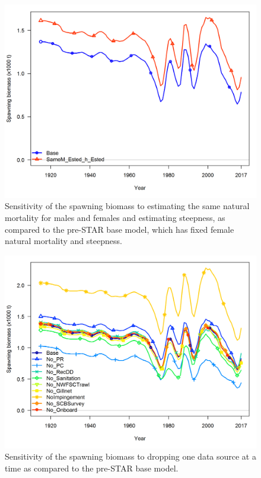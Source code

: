\documentclass[12pt,]{article}
\begin{document}
\FloatBarrier

\begin{figure}[htbp]
\centering
\includegraphics{Figures/sensitivity_spawnbio.png}
\caption{Sensitivity of the spawning biomass to estimating the same
natural mortality for males and females and estimating steepness, as
compared to the pre-STAR base model, which has fixed female natural
mortality and steepness. \label{fig:sensitivity_spawnbio}}
\end{figure}

\begin{figure}[htbp]
\centering
\includegraphics{Figures/sensitivity1_spawnbio.png}
\caption{Sensitivity of the spawning biomass to dropping one data source
at a time as compared to the pre-STAR base model.
\label{fig:sensitivity1_spawnbio}}
\end{figure}
\end{document}
